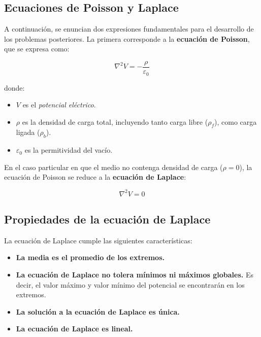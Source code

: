 \documentclass[
  11pt,
  letterpaper,
   answers
  ]{exam}
\begin{document}
\subsection*{Ecuaciones de Poisson y Laplace}

A continuación, se enuncian dos expresiones fundamentales para el desarrollo de los problemas posteriores.  
La primera corresponde a la \textbf{ecuación de Poisson}, que se expresa como:

\begin{equation}
\nabla^{2} V = -\frac{\rho}{\varepsilon_{0}}
\end{equation}

donde:
\begin{itemize}
    \item $V$ es el \textit{potencial eléctrico}.
    \item $\rho$ es la densidad de carga total, incluyendo tanto carga libre ($\rho_f$), como carga ligada ($\rho_b$).
    \item $\varepsilon_{0}$ es la permitividad del vacío.
\end{itemize}

En el caso particular en que el medio no contenga densidad de carga ($\rho = 0$), la ecuación de Poisson se reduce a la \textbf{ecuación de Laplace}:

\begin{equation}
\nabla^{2} V = 0
\end{equation}

\subsection*{Propiedades de la ecuación de Laplace}
La ecuación de Laplace cumple las siguientes características:
\begin{itemize}
    \item \textbf{La media es el promedio de los extremos.}
    \item \textbf{La ecuación de Laplace no tolera mínimos ni máximos globales.} Es decir, el valor máximo y valor mínimo del potencial se encontrarán en los extremos.
    \item \textbf{La solución a la ecuación de Laplace es única.}
    \item \textbf{La ecuación de Laplace es lineal.}
\end{itemize}
\end{document}
